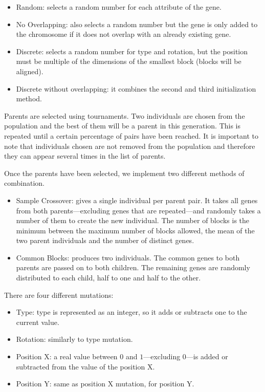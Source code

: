 \begin{itemize}
	\item Random: selects a random number for each attribute of the gene.
	\item No Overlapping: also selects a random number but the gene is only added to the chromosome if it does not overlap with an already existing gene.
	\item Discrete: selects a random number for type and rotation, but the position must be multiple of the dimensions of the smallest block (blocks will be aligned).
	\item Discrete without overlapping: it combines the second and third initialization method.
\end{itemize}

Parents are selected using tournaments. Two individuals are chosen from the population and the best of them will be a parent in this generation. This is repeated until a certain percentage of pairs have been reached. It is important to note that individuals chosen are not removed from the population and therefore they can appear several times in the list of parents. 

Once the parents have been selected, we implement two different methods of combination.
\begin{itemize}
	\item Sample Crossover: gives a single individual per parent pair. It takes all genes from both parents---excluding genes that are repeated---and randomly takes a number of them to create the new individual. The number of blocks is the minimum between the maximum number of blocks allowed, the mean of the two parent individuals and the number of distinct genes.
	\item Common Blocks: produces two individuals. The common genes to both parents are passed on to both children. The remaining genes are randomly distributed to each child, half to one and half to the other. 
\end{itemize}

There are four different mutations:

\begin{itemize}
	\item Type: type is represented as an integer, so it adds or subtracts one to the current value.
	\item Rotation: similarly to type mutation.
	\item Position X: a real value between $0$ and $1$---excluding $0$---is added or subtracted from the value of the position X.
	\item Position Y: same as position X mutation, for position Y.
\end{itemize}

